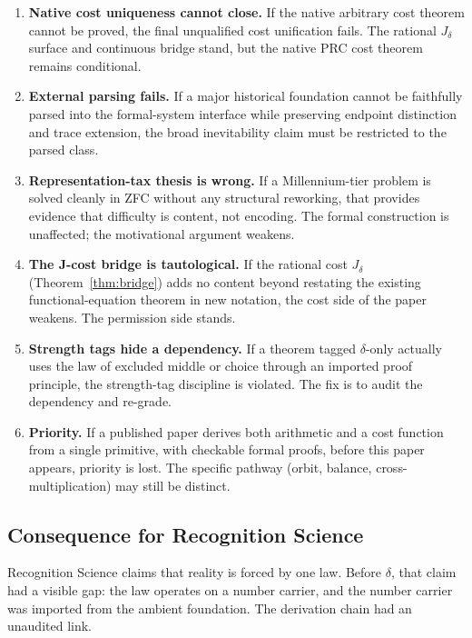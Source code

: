 \documentclass[11pt,a4paper]{article}
\theoremstyle{definition}
\theoremstyle{remark}
\begin{document}
\begin{enumerate}[leftmargin=2em]
  \item \textbf{Native cost uniqueness cannot close.} If the native arbitrary
    cost theorem cannot be proved, the final unqualified cost unification
    fails. The rational $J_\delta$ surface and continuous bridge stand, but
    the native PRC cost theorem remains conditional.
  \item \textbf{External parsing fails.} If a major historical foundation
    cannot be faithfully parsed into the formal-system interface while
    preserving endpoint distinction and trace extension, the broad
    inevitability claim must be restricted to the parsed class.
  \item \textbf{Representation-tax thesis is wrong.} If a Millennium-tier
    problem is solved cleanly in ZFC without any structural reworking, that
    provides evidence that difficulty is content, not encoding. The formal
    construction is unaffected; the motivational argument weakens.
  \item \textbf{The J-cost bridge is tautological.} If the rational cost
    $J_\delta$ (Theorem~\ref{thm:bridge}) adds no content beyond restating the
    existing functional-equation theorem in new notation, the cost side of the
    paper weakens. The permission side stands.
  \item \textbf{Strength tags hide a dependency.} If a theorem tagged
    $\delta$-only actually uses the law of excluded middle or choice through
    an imported proof principle, the strength-tag discipline is violated. The
    fix is to audit the dependency and re-grade.
  \item \textbf{Priority.} If a published paper derives both arithmetic and a
    cost function from a single primitive, with checkable formal proofs, before
    this paper appears, priority is lost. The specific pathway (orbit, balance,
    cross-multiplication) may still be distinct.
\end{enumerate}

\subsection{Consequence for Recognition Science}

Recognition Science claims that reality is forced by one law. Before $\delta$,
that claim had a visible gap: the law operates on a number carrier, and the
number carrier was imported from the ambient foundation. The derivation chain
had an unaudited link.
\end{document}
